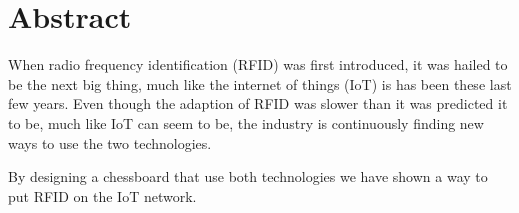 
\makeatletter
\renewenvironment{abstract}{%
  \if@twocolumn
    \section*{\abstractname}%
  \else
    \small
    \begin{center}%
    
      {\bfseries\abstractname\vspace{-.5em}\vspace{\z@}}%
    \end{center}%
    \quotation
  \fi}
  {\if@twocolumn\else\endquotation\fi}
\makeatother




\chapter*{Abstract}

When radio frequency identification (RFID) was first introduced, it was hailed to be the next big thing, much like the internet of things (IoT) is has been these last few years. Even though the adaption of RFID was slower than it was predicted it to be, much like IoT can seem to be, the industry is continuously finding new ways to use the two technologies.

By designing a chessboard that use both technologies we have shown a way to put RFID on the IoT network. 